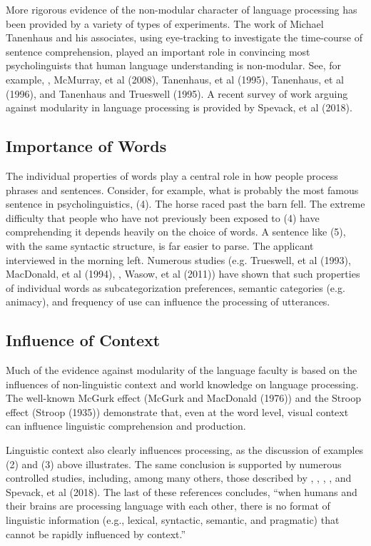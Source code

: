 \documentclass[a4paper]{article}
\begin{document}
More rigorous evidence of the non-modular character of language processing has been provided by a variety of types of experiments.  The work of Michael Tanenhaus and his associates, using eye-tracking to investigate the time-course of sentence comprehension, played an important role in convincing most psycholinguists that human language understanding is non-modular.  See, for example, \citet{EberhardEtal95}, McMurray, et al (2008), Tanenhaus, et al (1995), Tanenhaus, et al (1996), and Tanenhaus and Trueswell (1995). A recent survey of work arguing against modularity in language processing is provided by Spevack, et al (2018).  

\subsection{Importance of Words}

The individual properties of words play a central role in how people process phrases and sentences.  Consider, for example, what is probably the most famous sentence in psycholinguistics, (4).
\ea
The horse raced past the barn fell.
\z
The extreme difficulty that people who have not previously been exposed to (4) have comprehending it depends heavily on the choice of words.  A sentence like (5), with the same syntactic structure, is far easier to parse.
\ea
The applicant interviewed in the morning left.
\z
Numerous studies (e.g. Trueswell, et al (1993), MacDonald, et al (1994), \citet{BresnanEtal2007}, Wasow, et al (2011))  have shown that such properties of individual words as subcategorization preferences, semantic categories (e.g. animacy), and frequency of use can influence the processing of utterances.  

\subsection{Influence of Context}

Much of the evidence against modularity of the language faculty is based on the influences of non-linguistic context and world knowledge on language processing.  The well-known McGurk effect (McGurk and MacDonald (1976)) and the Stroop effect (Stroop (1935)) demonstrate that, even at the word level, visual context can influence linguistic comprehension and production.

Linguistic context also clearly influences processing, as the discussion of examples (2) and (3)
above illustrates.  The same conclusion is supported by numerous controlled studies, including,
among many others, those described by \citet{CS85a}, \citet{AltmannSteedman88},
\citet{Branigan2007}, \citet{TraxlerTooley2007a}, and Spevack, et al (2018).  The last of these references concludes, ``when humans and their brains are processing language with each other, there is no format
of linguistic information (e.g., lexical, syntactic, semantic, and pragmatic) that cannot be rapidly
influenced by context.''
\end{document}
